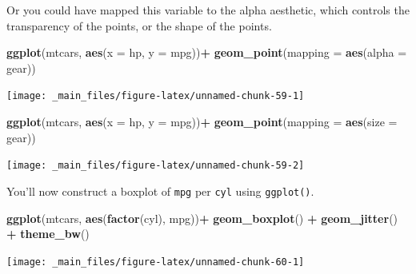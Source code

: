 \documentclass[
]{book}
\newenvironment{Shaded}{\begin{snugshade}}{\end{snugshade}}
\newcommand{\DataTypeTok}[1]{\textcolor[rgb]{0.13,0.29,0.53}{#1}}
\newcommand{\KeywordTok}[1]{\textcolor[rgb]{0.13,0.29,0.53}{\textbf{#1}}}
\newcommand{\NormalTok}[1]{#1}
\newcommand{\OperatorTok}[1]{\textcolor[rgb]{0.81,0.36,0.00}{\textbf{#1}}}
\newcommand{\StringTok}[1]{\textcolor[rgb]{0.31,0.60,0.02}{#1}}
\begin{document}
Or you could have mapped this variable to the alpha aesthetic, which controls the transparency of the points, or the shape of the points.

\begin{Shaded}
\begin{Highlighting}[]
\KeywordTok{ggplot}\NormalTok{(mtcars, }\KeywordTok{aes}\NormalTok{(}\DataTypeTok{x =}\NormalTok{ hp, }\DataTypeTok{y =}\NormalTok{ mpg))}\OperatorTok{+}
\StringTok{  }\KeywordTok{geom_point}\NormalTok{(}\DataTypeTok{mapping =} \KeywordTok{aes}\NormalTok{(}\DataTypeTok{alpha =}\NormalTok{ gear))}
\end{Highlighting}
\end{Shaded}

\begin{center}\texttt{[image: \_main\_files/figure-latex/unnamed-chunk-59-1]} \end{center}

\begin{Shaded}
\begin{Highlighting}[]
\KeywordTok{ggplot}\NormalTok{(mtcars, }\KeywordTok{aes}\NormalTok{(}\DataTypeTok{x =}\NormalTok{ hp, }\DataTypeTok{y =}\NormalTok{ mpg))}\OperatorTok{+}
\StringTok{  }\KeywordTok{geom_point}\NormalTok{(}\DataTypeTok{mapping =} \KeywordTok{aes}\NormalTok{(}\DataTypeTok{size =}\NormalTok{ gear))}
\end{Highlighting}
\end{Shaded}

\begin{center}\texttt{[image: \_main\_files/figure-latex/unnamed-chunk-59-2]} \end{center}

You'll now construct a boxplot of \texttt{mpg} per \texttt{cyl} using \texttt{ggplot()}.

\begin{Shaded}
\begin{Highlighting}[]
\KeywordTok{ggplot}\NormalTok{(mtcars, }\KeywordTok{aes}\NormalTok{(}\KeywordTok{factor}\NormalTok{(cyl), mpg))}\OperatorTok{+}
\StringTok{  }\KeywordTok{geom_boxplot}\NormalTok{() }\OperatorTok{+}\StringTok{ }\KeywordTok{geom_jitter}\NormalTok{() }\OperatorTok{+}\StringTok{ }\KeywordTok{theme_bw}\NormalTok{()}
\end{Highlighting}
\end{Shaded}

\begin{center}\texttt{[image: \_main\_files/figure-latex/unnamed-chunk-60-1]} \end{center}
\end{document}
